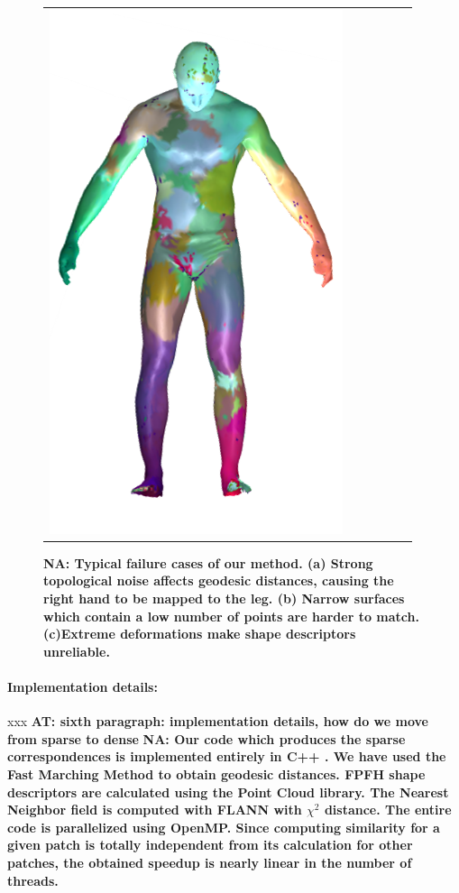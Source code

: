 \documentclass[10pt,twocolumn,letterpaper]{article}
\newcommand{\colornote}[3]{{\color{#1}\bf{#2: #3}\normalfont}}
\newcommand{\colornote}[3]{}
\newcommand {\ayellet}[1]{\colornote{blue}{AT}{#1}}
\newcommand {\nadav}[1]{\colornote{red}{NA}{#1}}
\begin{document}
\begin{figure}[htb]
\begin{tabular}{cccccc}
	\includegraphics[scale=0.7]{figures/FailCutsMatch.png}
\end{tabular}
\caption{\nadav{Typical failure cases of our method.
		 (a) Strong topological noise affects geodesic distances, causing the right hand to be mapped to the leg.
		 (b) Narrow surfaces which contain a low number of points are harder to match.
	     (c)Extreme deformations make shape descriptors unreliable.}}
	\label{fig:FailureCases}
\end{figure}

\paragraph{Implementation details:} xxx
\ayellet{sixth paragraph: implementation details, how do we move from sparse to dense}
\nadav{Our code which produces the sparse correspondences is implemented entirely in C++ . 
We have used the Fast Marching Method\cite{kimmel1996fast} to obtain geodesic distances.
FPFH shape descriptors are calculated using the Point Cloud library\cite{Rusu_ICRA2011_PCL}. 
The Nearest Neighbor field is computed with FLANN\cite{muja2009fast} with $\chi^2$ distance.
The entire code is parallelized using OpenMP. Since computing similarity for a given patch is totally independent from its calculation for other patches, the obtained speedup is nearly linear in the number of threads. 
}
\end{document}
